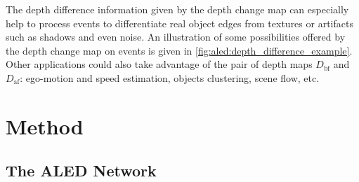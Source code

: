The depth difference information given by the depth change map can especially help to process events to differentiate real object edges from textures or artifacts such as shadows and even noise. An illustration of some possibilities offered by the depth change map on events is given in \cref{fig:aled:depth_difference_example}. Other applications could also take advantage of the pair of depth maps \(D_\text{bf}\) and \(D_\text{af}\): ego-motion and speed estimation, objects clustering, scene flow, etc.


\section{Method}\label{sec:aled:method}

\subsection{The ALED Network}

